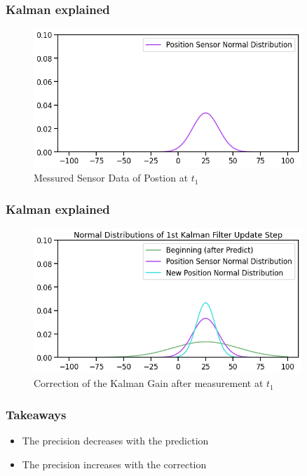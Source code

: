 \documentclass{beamer}
\begin{document}
\begin{frame}
    \frametitle{Kalman explained}
    \begin{figure}
        \centering
        \includegraphics[width=0.9\textwidth]{images/04_measurement.png}
        \caption{Messured Sensor Data of Postion at \(t_1\)}
    \end{figure}
\end{frame}

\begin{frame}
    \frametitle{Kalman explained}
    \begin{figure}
        \centering
        \includegraphics[width=0.9\textwidth]{images/05_correction.png}
        \caption{Correction of the Kalman Gain after measurement at \(t_1\)}
    \end{figure}
\end{frame}

\begin{frame}
    \frametitle{Takeaways}
    \begin{itemize}
        \item The precision decreases with the prediction
        \item The precision increases with the correction
    \end{itemize}

\end{frame}
\end{document}
